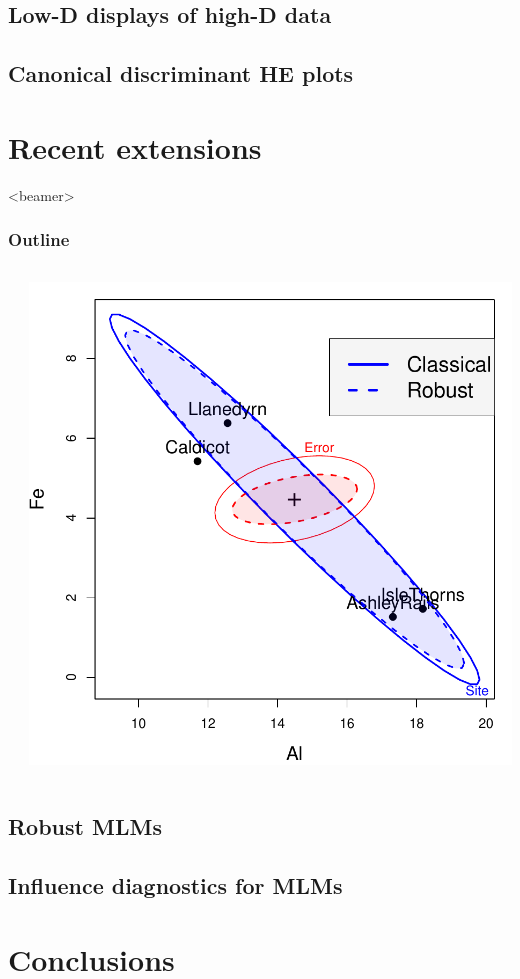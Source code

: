 \documentclass[10pt,t]{beamer}
\begin{document}
\subsection{Low-D displays of high-D data}

%
\subsection{Canonical discriminant HE plots}


\section{Recent extensions}
\begin{frame}<beamer>
  \frametitle{Outline}
	\begin{columns}[c]
	  \begin{column}{.6\textwidth}
	  \tableofcontents[currentsection]
	  \end{column}
	  \begin{column}{.4\textwidth}
	  \includegraphics[width=\textwidth]{figures/pottery-robust}
	  \end{column}
	\end{columns}
\end{frame}
\subsection{Robust MLMs}

\subsection[Influence diagnostics]{Influence diagnostics for MLMs}


\section{Conclusions}


%
\end{document}
